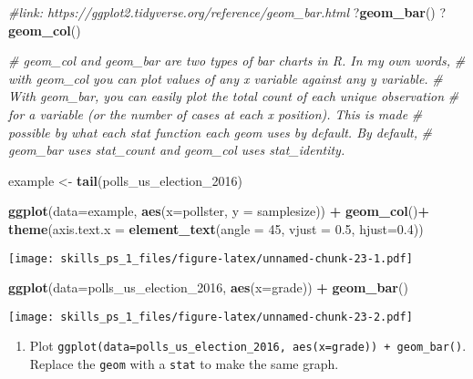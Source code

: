\documentclass[
]{article}
\newenvironment{Shaded}{\begin{snugshade}}{\end{snugshade}}
\newcommand{\CommentTok}[1]{\textcolor[rgb]{0.56,0.35,0.01}{\textit{#1}}}
\newcommand{\DataTypeTok}[1]{\textcolor[rgb]{0.13,0.29,0.53}{#1}}
\newcommand{\DecValTok}[1]{\textcolor[rgb]{0.00,0.00,0.81}{#1}}
\newcommand{\FloatTok}[1]{\textcolor[rgb]{0.00,0.00,0.81}{#1}}
\newcommand{\KeywordTok}[1]{\textcolor[rgb]{0.13,0.29,0.53}{\textbf{#1}}}
\newcommand{\NormalTok}[1]{#1}
\newcommand{\OperatorTok}[1]{\textcolor[rgb]{0.81,0.36,0.00}{\textbf{#1}}}
\newcommand{\StringTok}[1]{\textcolor[rgb]{0.31,0.60,0.02}{#1}}
\providecommand{\tightlist}{%
  \setlength{\itemsep}{0pt}\setlength{\parskip}{0pt}}
\begin{document}
\begin{Shaded}
\begin{Highlighting}[]
\CommentTok{#link: https://ggplot2.tidyverse.org/reference/geom_bar.html}
\NormalTok{?}\KeywordTok{geom_bar}\NormalTok{()}
\NormalTok{?}\KeywordTok{geom_col}\NormalTok{()}

\CommentTok{# geom_col and geom_bar are two types of bar charts in R. In my own words,}
\CommentTok{# with geom_col you can plot values of any x variable against any y variable.}
\CommentTok{# With geom_bar, you can easily plot the total count of each unique observation}
\CommentTok{# for a variable (or the number of cases at each x position). This is made}
\CommentTok{# possible by what each stat function each geom uses by default. By default,}
\CommentTok{# geom_bar uses stat_count and geom_col uses stat_identity.}

\NormalTok{example <-}\StringTok{ }\KeywordTok{tail}\NormalTok{(polls_us_election_}\DecValTok{2016}\NormalTok{)}
  
\KeywordTok{ggplot}\NormalTok{(}\DataTypeTok{data=}\NormalTok{example, }\KeywordTok{aes}\NormalTok{(}\DataTypeTok{x=}\NormalTok{pollster, }\DataTypeTok{y =}\NormalTok{ samplesize)) }\OperatorTok{+}\StringTok{ }\KeywordTok{geom_col}\NormalTok{()}\OperatorTok{+}\StringTok{ }
\StringTok{  }\KeywordTok{theme}\NormalTok{(}\DataTypeTok{axis.text.x =} \KeywordTok{element_text}\NormalTok{(}\DataTypeTok{angle =} \DecValTok{45}\NormalTok{, }\DataTypeTok{vjust =} \FloatTok{0.5}\NormalTok{, }\DataTypeTok{hjust=}\FloatTok{0.4}\NormalTok{))}
\end{Highlighting}
\end{Shaded}

\texttt{[image: skills\_ps\_1\_files/figure-latex/unnamed-chunk-23-1.pdf]}

\begin{Shaded}
\begin{Highlighting}[]
\KeywordTok{ggplot}\NormalTok{(}\DataTypeTok{data=}\NormalTok{polls_us_election_}\DecValTok{2016}\NormalTok{, }\KeywordTok{aes}\NormalTok{(}\DataTypeTok{x=}\NormalTok{grade)) }\OperatorTok{+}\StringTok{ }\KeywordTok{geom_bar}\NormalTok{()}
\end{Highlighting}
\end{Shaded}

\texttt{[image: skills\_ps\_1\_files/figure-latex/unnamed-chunk-23-2.pdf]}

\begin{enumerate}
\def\labelenumi{\arabic{enumi}.}
\tightlist
\item
  Plot
  \texttt{ggplot(data=polls\_us\_election\_2016,\ aes(x=grade))\ +\ geom\_bar()}.
  Replace the \texttt{geom} with a \texttt{stat} to make the same graph.
\end{enumerate}
\end{document}
